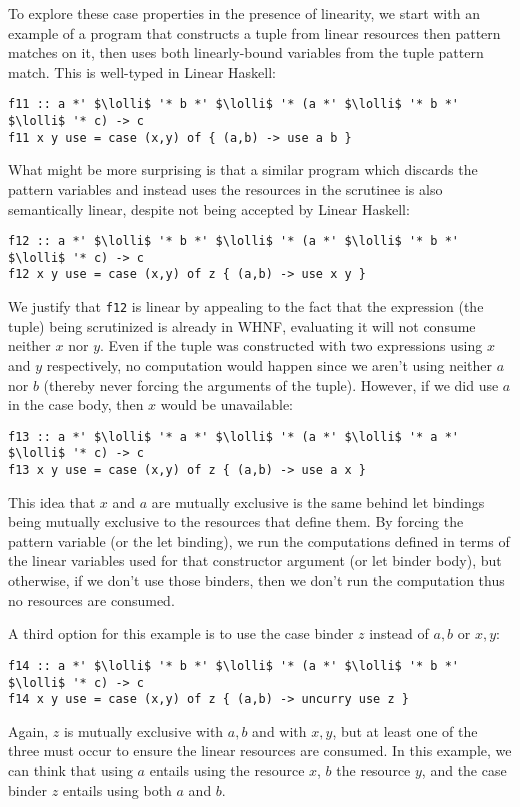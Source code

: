 \documentclass[acmsmall,review]{acmart}
\newcommand{\incode}[1]{\lstinline{#1}}
\newcommand{\lolli}{\multimap}
\begin{document}
To explore these case properties in the presence of linearity, we start with an
example of a program that constructs a tuple from linear resources then pattern
matches on it, then uses both linearly-bound variables from the tuple pattern
match. This is well-typed in Linear Haskell:
\begin{working}
\begin{lstlisting}
f11 :: a *' $\lolli$ '* b *' $\lolli$ '* (a *' $\lolli$ '* b *' $\lolli$ '* c) -> c
f11 x y use = case (x,y) of { (a,b) -> use a b }
\end{lstlisting}
\end{working}
What might be more surprising is that a similar program which discards the
pattern variables and instead uses the resources in the scrutinee is also
semantically linear, despite not being accepted by Linear Haskell:
\begin{notyet}
\begin{lstlisting}
f12 :: a *' $\lolli$ '* b *' $\lolli$ '* (a *' $\lolli$ '* b *' $\lolli$ '* c) -> c
f12 x y use = case (x,y) of z { (a,b) -> use x y }
\end{lstlisting}
\end{notyet}
We justify that \incode{f12} is linear by appealing to the fact that the
expression (the tuple) being scrutinized is already in WHNF, evaluating it will
not consume neither $x$ nor $y$. Even if the tuple was constructed with
two expressions using $x$ and $y$ respectively, no computation would happen
since we aren't using neither $a$ nor $b$ (thereby never forcing the arguments
of the tuple). However, if we did use $a$ in the case body, then $x$ would be unavailable:
\begin{noway}
\begin{lstlisting}
f13 :: a *' $\lolli$ '* a *' $\lolli$ '* (a *' $\lolli$ '* a *' $\lolli$ '* c) -> c
f13 x y use = case (x,y) of z { (a,b) -> use a x }
\end{lstlisting}
\end{noway}
This idea that $x$ and $a$ are mutually exclusive is the same behind let
bindings being mutually exclusive to the resources that define them.
By forcing the pattern variable (or the let binding), we run the computations
defined in terms of the linear variables used for that constructor argument (or
let binder body), but otherwise, if we don't use those binders, then we don't
run the computation thus no resources are consumed.

A third option for this example is to use the case binder $z$ instead of $a,b$ or $x,y$:
\begin{notyet}
\begin{lstlisting}
f14 :: a *' $\lolli$ '* b *' $\lolli$ '* (a *' $\lolli$ '* b *' $\lolli$ '* c) -> c
f14 x y use = case (x,y) of z { (a,b) -> uncurry use z }
\end{lstlisting}
\end{notyet}
Again, $z$ is mutually exclusive with $a,b$ and with $x,y$, but at least one of
the three must occur to ensure the linear resources are consumed. In this
example, we can think that using $a$ entails using the resource $x$, $b$ the
resource $y$, and the case binder $z$ entails using both $a$ and $b$.
\end{document}
